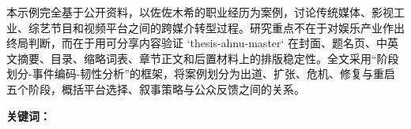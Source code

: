 
本示例完全基于公开资料，以佐佐木希的职业经历为案例，讨论传统媒体、影视工业、综艺节目和视频平台之间的跨媒介转型过程。研究重点不在于对娱乐产业作出终局判断，而在于用可分享内容验证 `thesis-ahnu-master` 在封面、题名页、中英文摘要、目录、缩略词表、章节正文和后置材料上的排版稳定性。全文采用“阶段划分-事件编码-韧性分析”的框架，将案例划分为出道、扩张、危机、修复与重启五个阶段，概括平台选择、叙事策略与公众反馈之间的关系。

\vspace{1.2cm}
\noindent\textbf{关键词：}\ahnuKeywordsZh

